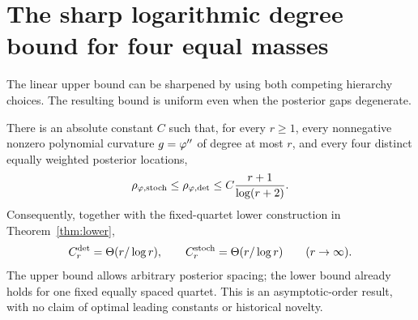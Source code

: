 \section{The sharp logarithmic degree bound for four equal masses}
\label{sec:logupper}
The linear upper bound can be sharpened by using both competing hierarchy choices. The resulting bound is uniform even when the posterior gaps degenerate.

\begin{theorem}
\label{thm:logupper}
There is an absolute constant $C$ such that, for every $r\ge1$, every nonnegative nonzero polynomial curvature $g=\varphi''$ of degree at most $r$, and every four distinct equally weighted posterior locations,
\[
\rho_{\varphi,\mathrm{stoch}}\le\rho_{\varphi,\mathrm{det}}
\le C\frac{r+1}{\log(r+2)}.
\]
Consequently, together with the fixed-quartet lower construction in Theorem~\ref{thm:lower},
\[
C_r^{\mathrm{det}}=\Theta(r/\log r),\qquad
C_r^{\mathrm{stoch}}=\Theta(r/\log r)\qquad(r\to\infty).
\]
The upper bound allows arbitrary posterior spacing; the lower bound already holds for one fixed equally spaced quartet. This is an asymptotic-order result, with no claim of optimal leading constants or historical novelty.
\end{theorem}
